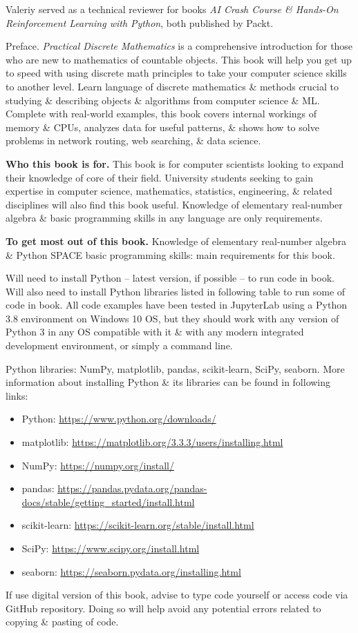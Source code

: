 \documentclass{article}
\begin{document}
\begin{enumerate}
	{\sc Valeriy} served as a technical reviewer for books {\it AI Crash Course \& Hands-On Reinforcement Learning with Python}, both published by Packt.
	
	{\sf Preface.} {\it Practical Discrete Mathematics} is a comprehensive introduction for those who are new to mathematics of countable objects. This book will help you get up to speed with using discrete math principles to take your computer science skills to another level. Learn language of discrete mathematics \& methods crucial to studying \& describing objects \& algorithms from computer science \& ML. Complete with real-world examples, this book covers internal workings of memory \& CPUs, analyzes data for useful patterns, \& shows how to solve problems in network routing, web searching, \& data science.
	
	{\bf Who this book is for.} This book is for computer scientists looking to expand their knowledge of core of their field. University students seeking to gain expertise in computer science, mathematics, statistics, engineering, \& related disciplines will also find this book useful. Knowledge of elementary real-number algebra \& basic programming skills in any language are only requirements.
	
	{\bf To get most out of this book.} Knowledge of elementary real-number algebra \& Python SPACE basic programming skills: main requirements for this book.
	
	Will need to install Python -- latest version, if possible -- to run code in book. Will also need to install Python libraries listed in following table to run some of code in book. All code examples have been tested in JupyterLab using a Python 3.8 environment on Windows 10 OS, but they should work with any version of Python 3 in any OS compatible with it \& with any modern integrated development environment, or simply a command line.
	
	Python libraries: NumPy, matplotlib, pandas, scikit-learn, SciPy, seaborn. More information about installing Python \& its libraries can be found in following links:
	\begin{itemize}
		\item Python: \url{https://www.python.org/downloads/}
		\item matplotlib: \url{https://matplotlib.org/3.3.3/users/installing.html}
		\item NumPy: \url{https://numpy.org/install/}
		\item pandas: \url{https://pandas.pydata.org/pandas-docs/stable/getting_started/install.html}
		\item scikit-learn: \url{https://scikit-learn.org/stable/install.html}
		\item SciPy: \url{https://www.scipy.org/install.html}
		\item seaborn: \url{https://seaborn.pydata.org/installing.html}
	\end{itemize}
	If use digital version of this book, advise to type code yourself or access code via GitHub repository. Doing so will help avoid any potential errors related to copying \& pasting of code.
	

\end{enumerate}
\end{document}
